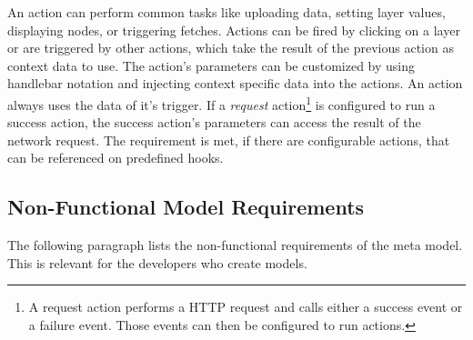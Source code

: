 \begin{enumerate}
	An action can perform common tasks like uploading data, setting layer values, displaying nodes, or triggering fetches.
	Actions can be fired by clicking on a layer or are triggered by other actions, which take the result of the previous action as context data to use.
	The action's parameters can be customized by using handlebar notation and injecting context specific data into the actions.
	An action always uses the data of it's trigger.
	If a \textit{request} action\footnote{A request action performs a HTTP request and calls either a success event or a failure event. Those events can then be configured to run actions.} is configured to run a success action, the success action's parameters can access the result of the network request.
	The requirement is met, if there are configurable actions, that can be referenced on predefined hooks.
\end{enumerate}

\subsection{Non-Functional Model Requirements}

The following paragraph lists the non-functional requirements of the meta model.
This is relevant for the developers who create models.

